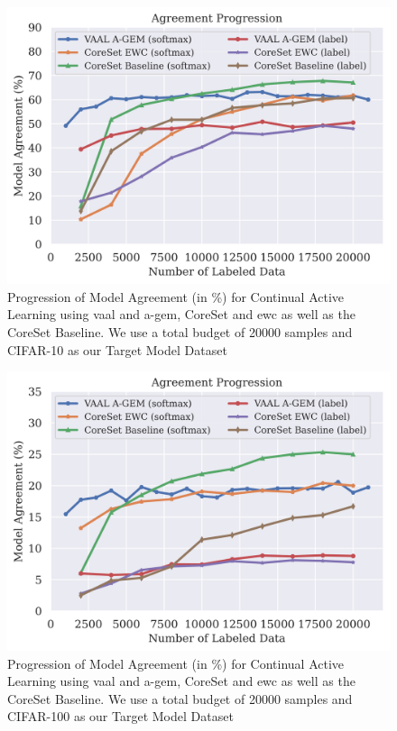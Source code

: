 \begin{figure}[h]
    \centering
    \includegraphics[width=0.7\linewidth]{images/results_CALMS/cifar_vaal_agem.png}
    \caption[Agreement Comparison for Model Stealing on CIFAR-10 using VAAL and AGEM]{Progression of Model Agreement (in \%)
    for Continual Active Learning using \gls{vaal} and \gls{a-gem}, CoreSet and \gls{ewc} as well as the CoreSet Baseline.
    We use a total budget of 20000 samples and CIFAR-10 as our Target Model Dataset}
    \label{fig:CALMScifarVAAL_AGEM}
\end{figure}

\begin{figure}[h]
    \centering
    \includegraphics[width=0.7\linewidth]{images/results_CALMS/cifar100_vaal_agem.png}
    \caption[Agreement Comparison for Model Stealing on CIFAR-100 using VAAL and AGEM]{Progression of Model Agreement (in \%)
    for Continual Active Learning using \gls{vaal} and \gls{a-gem}, CoreSet and \gls{ewc} as well as the CoreSet Baseline.
    We use a total budget of 20000 samples and CIFAR-100 as our Target Model Dataset}
    \label{fig:CALMScifar100VAAL_AGEM}
\end{figure}

